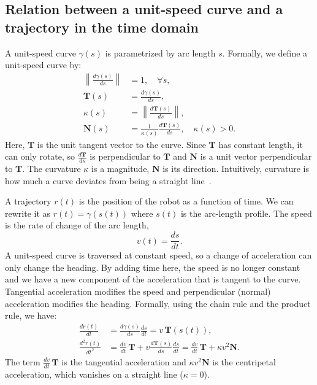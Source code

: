\documentclass[12pt,letterpaper,oneside]{article}
\begin{document}
\subsection{Relation between a unit-speed curve and a trajectory in the time domain}
A unit-speed curve $\gamma(s)$ is parametrized by arc length $s$.
Formally, we define a unit-speed curve by:
\begin{align}
  \left\| \frac{d\gamma(s)}{ds} \right\| & = 1, \quad \forall s, \\
  \mathbf{T}(s) & = \frac{d\gamma(s)}{ds}, \\
  \kappa(s) & = \left\| \frac{d\mathbf{T}(s)}{ds} \right\|, \\
  \mathbf{N}(s) & = \frac{1}{\kappa(s)} \frac{d\mathbf{T}(s)}{ds}, \quad \kappa(s) > 0.
\end{align}
Here, $\mathbf{T}$ is the unit tangent vector to the curve.
Since $\mathbf{T}$ has constant length, it can only rotate, so $\frac{d\mathbf{T}}{ds}$ is perpendicular to $\mathbf{T}$ and $\mathbf{N}$ is a unit vector perpendicular to $\mathbf{T}$.
The curvature $\kappa$ is a magnitude, $\mathbf{N}$ is its direction.
Intuitively, curvature is how much a curve deviates from being a straight line~\cite{wikiCurvature}.

A trajectory $r(t)$ is the position of the robot as a function of time.
We can rewrite it as $r(t) = \gamma(s(t))$ where $s(t)$ is the arc-length profile.
The speed is the rate of change of the arc length,
\begin{equation}
  v(t) = \frac{ds}{dt}.
\end{equation}
A unit-speed curve is traversed at constant speed, so a change of acceleration can only change the heading.
By adding time here, the speed is no longer constant and we have a new component of the acceleration that is tangent to the curve.
Tangential acceleration modifies the speed and perpendicular (normal) acceleration modifies the heading.
Formally, using the chain rule and the product rule, we have:
\begin{align}
  \frac{d r(t)}{dt} & = \frac{d\gamma(s)}{ds} \frac{ds}{dt} = v\, \mathbf{T}(s(t)), \\
  \frac{d^2 r(t)}{dt^2} & = \frac{dv}{dt}\, \mathbf{T} + v \frac{d\mathbf{T}(s)}{ds} \frac{ds}{dt} = \frac{dv}{dt}\, \mathbf{T} + \kappa v^2 \mathbf{N}.
\end{align}
The term $\frac{dv}{dt}\,\mathbf{T}$ is the tangential acceleration and $\kappa v^2 \mathbf{N}$ is the centripetal acceleration, which vanishes on a straight line ($\kappa = 0$).
\end{document}
